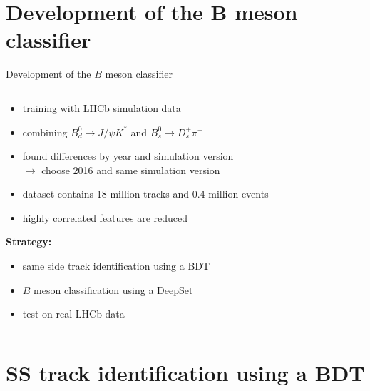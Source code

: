 \documentclass[aspectratio=1610, 10pt]{beamer}
\begin{document}
\section*{Development of the B meson classifier}

\begin{frame}{Development of the $B$ meson classifier}
  \centering
  \begin{columns}
    \begin{column}{0.6\textwidth}
      \begin{itemize}
        \item training with LHCb simulation data
        \item combining $B^0_d \rightarrow J/\psi K^*$ and $B^0_s \rightarrow D_s^+ \pi^-$
        \item found differences by year and simulation version \\$\rightarrow$ choose 2016 and same simulation version
        \item dataset contains 18 million tracks and 0.4 million events
        \item highly correlated features are reduced 
      \end{itemize}

      \textbf{Strategy:}
      \begin{itemize}
        \item same side track identification using a BDT
        \item $B$ meson classification using a DeepSet
        \item test on real LHCb data
      \end{itemize}
    \end{column}
  \end{columns}
\end{frame}

\section*{SS track identification using a BDT}
\end{document}
